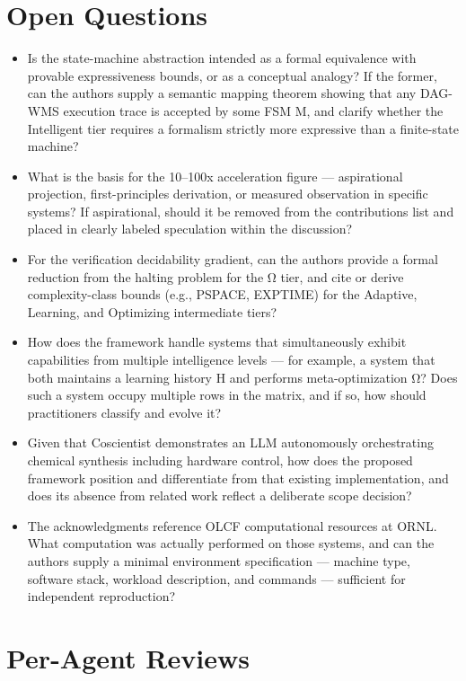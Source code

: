 \documentclass[11pt]{article}
\begin{document}
\section*{Open Questions}
\begin{itemize}[leftmargin=*]
  \item Is the state-machine abstraction intended as a formal equivalence with provable expressiveness bounds, or as a conceptual analogy? If the former, can the authors supply a semantic mapping theorem showing that any DAG-WMS execution trace is accepted by some FSM M, and clarify whether the Intelligent tier requires a formalism strictly more expressive than a finite-state machine?
  \item What is the basis for the 10–100x acceleration figure — aspirational projection, first-principles derivation, or measured observation in specific systems? If aspirational, should it be removed from the contributions list and placed in clearly labeled speculation within the discussion?
  \item For the verification decidability gradient, can the authors provide a formal reduction from the halting problem for the Ω tier, and cite or derive complexity-class bounds (e.g., PSPACE, EXPTIME) for the Adaptive, Learning, and Optimizing intermediate tiers?
  \item How does the framework handle systems that simultaneously exhibit capabilities from multiple intelligence levels — for example, a system that both maintains a learning history H and performs meta-optimization Ω? Does such a system occupy multiple rows in the matrix, and if so, how should practitioners classify and evolve it?
  \item Given that Coscientist demonstrates an LLM autonomously orchestrating chemical synthesis including hardware control, how does the proposed framework position and differentiate from that existing implementation, and does its absence from related work reflect a deliberate scope decision?
  \item The acknowledgments reference OLCF computational resources at ORNL. What computation was actually performed on those systems, and can the authors supply a minimal environment specification — machine type, software stack, workload description, and commands — sufficient for independent reproduction?
\end{itemize}

\section*{Per-Agent Reviews}
\end{document}
